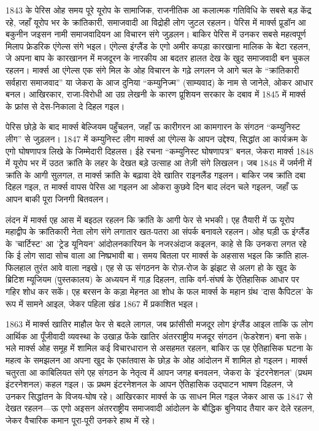 \documentclass[12pt,a4paper,oneside]{book}
\begin{document}
1843 के पेरिस ओह समय पूरे यूरोप के सामाजिक, राजनीतिक आ कलात्मक गतिविधि के सबसे बड़ केंद्र रहे, जहाँ यूरोप भर के क्रांतिकारी, समाजवादी आ विद्रोही लोग जुटल रहलन। पेरिस में मार्क्स प्रूडॉन आ बकुनीन जइसन नामी समाजवादियन आ विचारन संगे जुड़लन। बाकिर पेरिस में उनकर सबसे महत्वपूर्ण मिलाप फ्रेडरिक एंगेल्स संगे भइल। एंगेल्स इंग्लैंड के एगो अमीर कपड़ा कारखाना मालिक के बेटा रहलन, जे अपना बाप के कारखानन में मजदूरन के नारकीय आ बदतर हालत देख के खुद समाजवादी बन चुकल रहलन। मार्क्स आ एंगेल्स एक संगे मिल के ओह विचारन के गढ़े लगलन जे आगे चल के “क्रांतिकारी सर्वहारा समाजवाद” या जेकरा के आज दुनिया “कम्युनिज्म” (साम्यवाद) के नाम से जानेले, ओकर आधार बनल। आखिरकार, राजा-विरोधी आ उग्र लेखनी के कारण प्रूशियन सरकार के दबाव में 1845 में मार्क्स के फ्रांस से देस-निकाला दे दिहल गइल।

पेरिस छोड़े के बाद मार्क्स बेल्जियम पहुँचलन, जहाँ ऊ कारीगरन आ कामगारन के संगठन “कम्युनिस्ट लीग” से जुड़लन। 1847 में कम्युनिस्ट लीग मार्क्स आ एंगेल्स के आपन उद्देश्य, सिद्धांत आ कार्यक्रम के एगो घोषणापत्र लिखे के जिम्मेदारी दिहलस। ईहे रचना “कम्युनिस्ट घोषणापत्र” बनल, जेकरा मार्क्स 1848 में यूरोप भर में उठत क्रांति के लहर के देखत बड़े उत्साह आ तेज़ी संगे लिखलन। जब 1848 में जर्मनी में क्रांति के आगी सुलगल, त मार्क्स क्रांति के बढ़ावा देवे खातिर राइनलैंड गइलन। बाकिर जब क्रांति दबा दिहल गइल, त मार्क्स वापस पेरिस आ गइलन आ ओकरा कुछवे दिन बाद लंदन चले गइलन, जहाँ ऊ आपन बाकी पूरा जिनगी बितवलन।

लंदन में मार्क्स एह आस में बइठल रहलन कि क्रांति के आगी फेर से भभकी। एह तैयारी में ऊ यूरोप महाद्वीप के क्रांतिकारी नेता लोग संगे लगातार खत-पतरा आ संपर्क बनावले रहलन। ओह घड़ी ऊ इंग्लैंड के 'चार्टिस्ट' आ 'ट्रेड यूनियन' आंदोलनकारियन के नजरअंदाज कइलन, काहे से कि उनकरा लगत रहे कि ई लोग सादा सोच वाला आ निष्प्रभावी बा। समय बितला पर मार्क्स के अहसास भइल कि क्रांति हाल-फिलहाल तुरंत आवे वाला नइखे। एह से ऊ संगठनन के रोज़-रोज के झंझट से अलग हो के खुद के ब्रिटिश म्यूजियम (पुस्तकालय) के अध्ययन में गाड़ दिहलन, ताकि वर्ग-संघर्ष के ऐतिहासिक आधार पर गहिर शोध कर सकें। एह बरसन के कड़ा मेहनत आ शोध के फल मार्क्स के महान ग्रंथ 'दास कैपिटल' के रूप में सामने आइल, जेकर पहिला खंड 1867 में प्रकाशित भइल।

1863 में मार्क्स खातिर माहौल फेर से बदले लागल, जब फ्रांसीसी मजदूर लोग इंग्लैंड आइल ताकि ऊ लोग आर्थिक आ पूँजीवादी व्यवस्था के उखाड़ फेंके खातिर अंतरराष्ट्रीय मजदूर संगठन (फेडरेशन) बना सके। भले मार्क्स ओह समूह में शामिल कई विचारधारान से असहमत रहलन, बाकिर ऊ एह ऐतिहासिक घटना के महत्व के समझलन आ अपना खुद के एकांतवास के छोड़ के ओह आंदोलन में शामिल हो गइलन। मार्क्स चतुरता आ काबिलियत संगे एह संगठन के नेतृत्व में आपन जगह बनवलन, जेकरा के 'इंटरनेशनल' (प्रथम इंटरनेशनल) कहल गइल। ऊ प्रथम इंटरनेशनल के आपन ऐतिहासिक उद्घाटन भाषण दिहलन, जे उनकर सिद्धांतन के विजय-घोष रहे। आखिरकार मार्क्स के ऊ साधन मिल गइल जेकर आस ऊ 1847 से देखत रहलन—ऊ एगो अइसन अंतरराष्ट्रीय समाजवादी आंदोलन के बौद्धिक बुनियाद तैयार कर देले रहलन, जेकर वैचारिक कमान पूरा-पूरी उनकरे हाथ में रहे।
\end{document}
